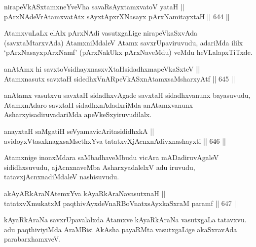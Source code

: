\begin{shl}
nirapeVkASxtamxneYveVha savaRsAyx\s \s tamxvatoV yataH || \\
pArxNAdeVrAtamxvatAtx sAyxtApxrXNasayx pArxNamitayxtaH \hfill || 644 ||  
\end{shl}

\begin{artha}
AtamxvuLaLx elAlx pArxNAdi vasutxgaLige nirapeVkaSxvAda
(savxtaMtarxvAda) AtamxniMdaleV Atamx savxrUpaviruvudu, adariMda ililx
`pArxNasayxpArxNamf' (pArxNakUkx pArxNaveMdu) veMdu heVLalapxTiTxde.
\end{artha}

\begin{shl}
anAtAmx hi savxtoV\s sidhayxnasxvXtaHsidadhxmapeVkaSxteV || \\
Atamxnasutx savxtaH sidedhxVnARpeVkASx\s nAtamxsaMsharxyAtf \hfill || 645 ||  
\end{shl}

\begin{artha}
anAtamx vasutxvu savxtaH sidadhxvAgade savxtaH sidadhxvanunx
bayasuvudu, AtamxnAdaro savxtaH sidadhxnAdadxriMda anAtamxvanunx
AsharxyisadiruvadariMda apeVkeSxyiruvudilalx.
\end{artha}


\begin{shl}
anayxtaH saMgatiH seVyamavicAritasididhxkA || \\
avidoyxVtasxknagxsaMsethxYva tatatxvXjAcnxnAdivxnashayxti \hfill || 646 ||  
\end{shl}

\begin{artha}
Atamxnige inonxMdara saMbadhaveMbudu vicAra mADadiruvAgaleV
sididhxsuvudu, ajAcnxnaveMba AsharxyadalelxV adu iruvudu,
tatavxjAcnxnadiMdaleV nashisuvudu.
\end{artha}


\begin{shl}
akAyARkAraNAtemxYva kAyaRkAraNavasutxnaH || \\
tatatxvXmukatxM paqthivAyxdeVnaRBoVnatxsAyxkaSxraM paramf \hfill || 647 ||  
\end{shl}

\begin{artha}
kAyaRkAraNa savxrUpavalalxda Atamxve kAyaRkAraNa vasutxgaLa tatavxvu.
adu paqthiviyiMda AraMBisi AkAsha payaRMta vasutxgaLige akaSxravAda parabarxhamxveV.
\end{artha}

